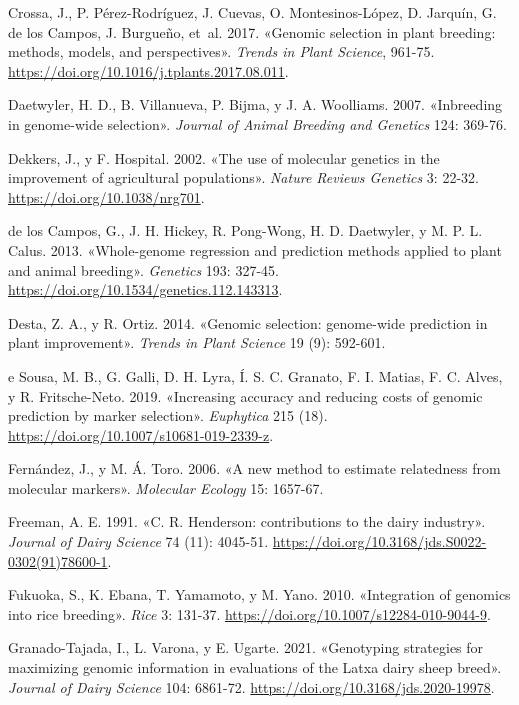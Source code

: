 \documentclass[11pt,spanish,a4paper,oneside,]{book} %
\begin{document}
\leavevmode\hypertarget{ref-cite:37}{}%
Crossa, J., P. Pérez-Rodríguez, J. Cuevas, O. Montesinos-López, D. Jarquín, G. de los Campos, J. Burgueño, et~al. 2017. «Genomic selection in plant breeding: methods, models, and perspectives». \emph{Trends in Plant Science}, 961-75. \url{https://doi.org/10.1016/j.tplants.2017.08.011}.

\leavevmode\hypertarget{ref-cite:40}{}%
Daetwyler, H. D., B. Villanueva, P. Bijma, y J. A. Woolliams. 2007. «Inbreeding in genome-wide selection». \emph{Journal of Animal Breeding and Genetics} 124: 369-76.

\leavevmode\hypertarget{ref-cite:59}{}%
Dekkers, J., y F. Hospital. 2002. «The use of molecular genetics in the improvement of agricultural populations». \emph{Nature Reviews Genetics} 3: 22-32. \url{https://doi.org/10.1038/nrg701}.

\leavevmode\hypertarget{ref-cite:31}{}%
de los Campos, G., J. H. Hickey, R. Pong-Wong, H. D. Daetwyler, y M. P. L. Calus. 2013. «Whole-genome regression and prediction methods applied to plant and animal breeding». \emph{Genetics} 193: 327-45. \url{https://doi.org/10.1534/genetics.112.143313}.

\leavevmode\hypertarget{ref-cite:10}{}%
Desta, Z. A., y R. Ortiz. 2014. «Genomic selection: genome-wide prediction in plant improvement». \emph{Trends in Plant Science} 19 (9): 592-601.

\leavevmode\hypertarget{ref-cite:84}{}%
e Sousa, M. B., G. Galli, D. H. Lyra, Í. S. C. Granato, F. I. Matias, F. C. Alves, y R. Fritsche-Neto. 2019. «Increasing accuracy and reducing costs of genomic prediction by marker selection». \emph{Euphytica} 215 (18). \url{https://doi.org/10.1007/s10681-019-2339-z}.

\leavevmode\hypertarget{ref-cite:24}{}%
Fernández, J., y M. Á. Toro. 2006. «A new method to estimate relatedness from molecular markers». \emph{Molecular Ecology} 15: 1657-67.

\leavevmode\hypertarget{ref-cite:28}{}%
Freeman, A. E. 1991. «C. R. Henderson: contributions to the dairy industry». \emph{Journal of Dairy Science} 74 (11): 4045-51. \url{https://doi.org/10.3168/jds.S0022-0302(91)78600-1}.

\leavevmode\hypertarget{ref-cite:61}{}%
Fukuoka, S., K. Ebana, T. Yamamoto, y M. Yano. 2010. «Integration of genomics into rice breeding». \emph{Rice} 3: 131-37. \url{https://doi.org/10.1007/s12284-010-9044-9}.

\leavevmode\hypertarget{ref-cite:88}{}%
Granado-Tajada, I., L. Varona, y E. Ugarte. 2021. «Genotyping strategies for maximizing genomic information in evaluations of the Latxa dairy sheep breed». \emph{Journal of Dairy Science} 104: 6861-72. \url{https://doi.org/10.3168/jds.2020-19978}.
\end{document}
